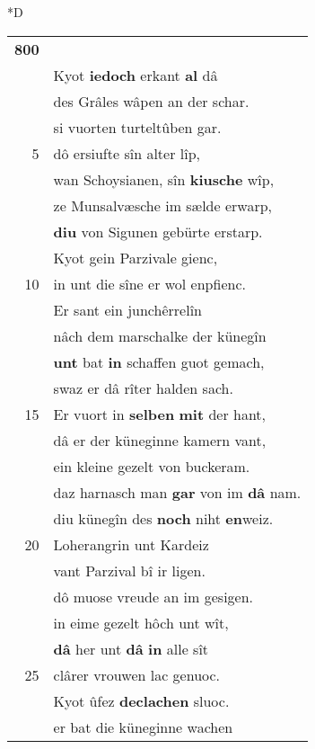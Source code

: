 \documentclass[8pt,a4paper,notitlepage]{article}
\begin{document}
\begin{table}[ht]
\begin{minipage}[t]{0.5\linewidth}
\small
\begin{center}*D
\end{center}
\begin{tabular}{rl}
\textbf{800} & \textit{\begin{large}D\end{large}}es tages blic was dennoch grâ.\\ 
 & Kyot \textbf{iedoch} erkant \textbf{al} dâ\\ 
 & des Grâles wâpen an der schar.\\ 
 & si vuorten turteltûben gar.\\ 
5 & dô ersiufte sîn alter lîp,\\ 
 & wan Schoysianen, sîn \textbf{kiusche} wîp,\\ 
 & ze Munsalvæsche im sælde erwarp,\\ 
 & \textbf{diu} von Sigunen gebürte erstarp.\\ 
 & Kyot gein Parzivale gienc,\\ 
10 & in unt die sîne er wol enpfienc.\\ 
 & Er sant ein junchêrrelîn\\ 
 & nâch dem marschalke der künegîn\\ 
 & \textbf{unt} bat \textbf{in} schaffen guot gemach,\\ 
 & swaz er dâ rîter halden sach.\\ 
15 & Er vuort in \textbf{selben} \textbf{mit} der hant,\\ 
 & dâ er der küneginne kamern vant,\\ 
 & ein kleine gezelt von buckeram.\\ 
 & daz harnasch man \textbf{gar} von im \textbf{dâ} nam.\\ 
 & diu künegîn des \textbf{noch} niht \textbf{en}weiz.\\ 
20 & Loherangrin unt Kardeiz\\ 
 & vant Parzival bî ir ligen.\\ 
 & dô muose vreude an im gesigen.\\ 
 & in eime gezelt hôch unt wît,\\ 
 & \textbf{dâ} her unt \textbf{dâ} \textbf{in} alle sît\\ 
25 & clârer vrouwen lac genuoc.\\ 
 & Kyot ûfez \textbf{declachen} sluoc.\\ 
 & er bat die küneginne wachen\\ 

\end{tabular}
\end{minipage}
\end{table}
\end{document}
